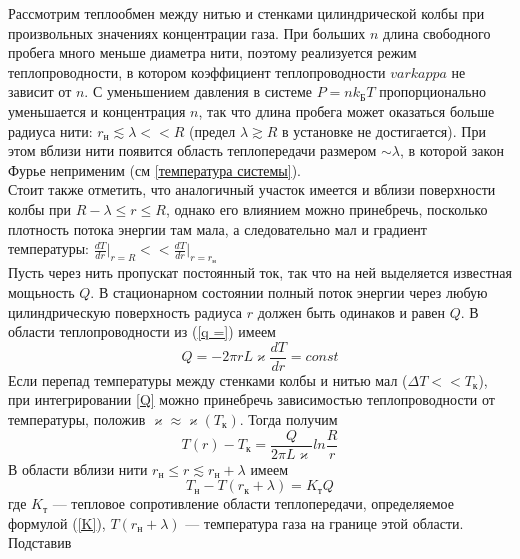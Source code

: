 \documentclass[12pt]{article}
\begin{document}
        Рассмотрим теплообмен между нитью и стенками цилиндрической колбы при произвольных значениях концентрации газа.
        При больших $n$ длина свободного пробега много меньше диаметра нити, поэтому реализуется режим теплопроводности, в
        котором коэффициент теплопроводности $varkappa$ не зависит от $n$. С уменьшением давления в
        системе $P = nk_{\text{Б}}T$ пропорционально уменьшается и концентрация $n$, так что длина пробега может оказаться больше 
        радиуса нити: $r_{\text{н}} \lesssim \lambda << R$ (предел $\lambda \gtrsim R$ в установке не достигается). При этом вблизи нити появится 
        область теплопередачи размером $\sim \lambda$, в которой закон Фурье неприменим (см \ref{температура системы}).\\
        Стоит также отметить, что аналогичный участок имеется и вблизи поверхности колбы при $R - \lambda \le r \le R$, однако 
        его влиянием можно принебречь, посколько плотность потока энергии там мала, а следовательно мал и 
        градиент температуры: $\frac{dT}{dr}\bigg|_{r=R} << \frac{dT}{dr}\bigg|_{r=r_{\text{н}}} $\\
        Пусть через нить пропускат постоянный ток, так что на ней выделяется известная мощьность $Q$. В стационарном состоянии полный поток энергии через 
        любую цилиндрическую поверхность радиуса $r$ должен быть одинаков и равен $Q$. В области теплопроводности из (\ref{q =}) имеем
        \begin{equation}\label{Q}
            Q = -2\pi r L\varkappa \frac{dT}{dr} = const
        \end{equation}
        Если перепад температуры между стенками колбы и нитью мал ($\Delta T << T_{\text{к}}$), при интегрировании \ref{Q} можно принебречь зависимостью теплопроводности
        от температуры, положив $\varkappa \approx \varkappa(T_{\text{к}})$. Тогда получим 
        \begin{equation}\label{T_r)}
            T(r) - T_{\text{к}} = \frac{Q}{2\pi L\varkappa}ln \frac{R}{r}
        \end{equation}
        В области вблизи нити $r_{\text{н}} \le r \lesssim r_{\text{н}} + \lambda$ имеем
        \begin{equation}\label{T_h}
            T_{\text{н}} - T(r_{\text{к}} + \lambda) = K_{\text{т}}Q
        \end{equation}
        где $K_{\text{т}}$ — тепловое сопротивление области теплопередачи, определяемое формулой (\ref{K}), $T(r_{\text{н}} + \lambda)$ — температура газа на границе этой области. Подставив
\end{document}
